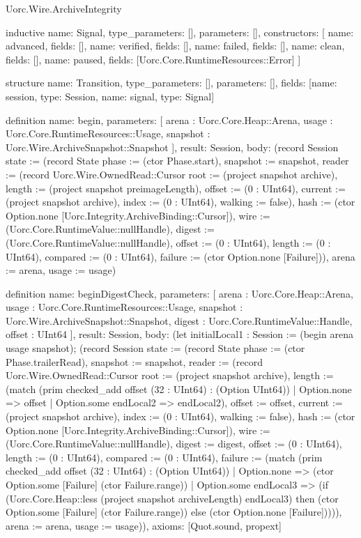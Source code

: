 \begin{lexlean}{Uorc.Wire.ArchiveIntegrity}
\begin{semanticmodule}
inductive{
  name: Signal,
  type_parameters: [],
  parameters: [],
  constructors: [
    {name: advanced, fields: []},
    {name: verified, fields: []},
    {name: failed, fields: []},
    {name: clean, fields: []},
    {name: paused, fields: [Uorc.Core.RuntimeResources::Error]}
  ]
}

structure{
  name: Transition,
  type_parameters: [],
  parameters: [],
  fields: [{name: session, type: Session}, {name: signal, type: Signal}]
}

definition{
  name: begin,
  parameters: [
    arena : Uorc.Core.Heap::Arena,
    usage : Uorc.Core.RuntimeResources::Usage,
    snapshot : Uorc.Wire.ArchiveSnapshot::Snapshot
  ],
  result: Session,
  body: (record Session {state := (record State {phase := (ctor Phase.start), snapshot := snapshot, reader := (record Uorc.Wire.OwnedRead::Cursor {root := (project snapshot archive), length := (project snapshot preimageLength), offset := (0 : UInt64), current := (project snapshot archive), index := (0 : UInt64), walking := false}), hash := (ctor Option.none [Uorc.Integrity.ArchiveBinding::Cursor]), wire := (Uorc.Core.RuntimeValue::nullHandle), digest := (Uorc.Core.RuntimeValue::nullHandle), offset := (0 : UInt64), length := (0 : UInt64), compared := (0 : UInt64), failure := (ctor Option.none [Failure])}), arena := arena, usage := usage})
}

definition{
  name: beginDigestCheck,
  parameters: [
    arena : Uorc.Core.Heap::Arena,
    usage : Uorc.Core.RuntimeResources::Usage,
    snapshot : Uorc.Wire.ArchiveSnapshot::Snapshot,
    digest : Uorc.Core.RuntimeValue::Handle,
    offset : UInt64
  ],
  result: Session,
  body: (let initialLocal1 : Session := (begin arena usage snapshot); (record Session {state := (record State {phase := (ctor Phase.trailerRead), snapshot := snapshot, reader := (record Uorc.Wire.OwnedRead::Cursor {root := (project snapshot archive), length := (match (prim checked_add offset (32 : UInt64) : (Option UInt64))
    | Option.none => offset
    | Option.some endLocal2 => endLocal2), offset := offset, current := (project snapshot archive), index := (0 : UInt64), walking := false}), hash := (ctor Option.none [Uorc.Integrity.ArchiveBinding::Cursor]), wire := (Uorc.Core.RuntimeValue::nullHandle), digest := digest, offset := (0 : UInt64), length := (0 : UInt64), compared := (0 : UInt64), failure := (match (prim checked_add offset (32 : UInt64) : (Option UInt64))
    | Option.none => (ctor Option.some [Failure] (ctor Failure.range))
    | Option.some endLocal3 => (if (Uorc.Core.Heap::less (project snapshot archiveLength) endLocal3) then (ctor Option.some [Failure] (ctor Failure.range)) else (ctor Option.none [Failure])))}), arena := arena, usage := usage})),
  axioms: [Quot.sound, propext]
}


\end{semanticmodule}
\end{lexlean}

